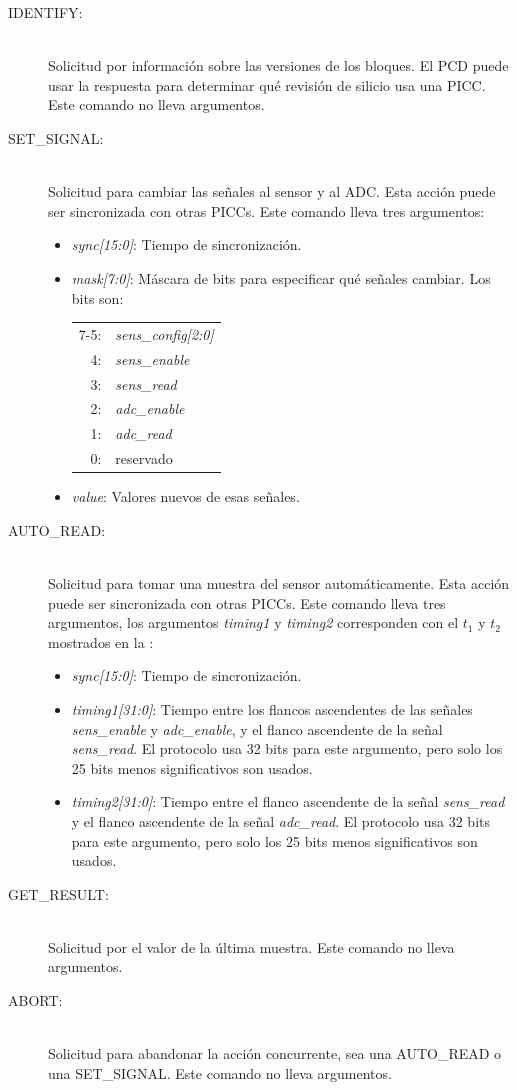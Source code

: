 \documentclass[a4paper, twoside, 11pt]{report}
\begin{document}
\begin{description}
  \item[IDENTIFY:] \hfill \\ Solicitud por información sobre las versiones de los bloques. El PCD puede usar la respuesta para determinar qué revisión de silicio usa una PICC. Este comando no lleva argumentos.
  \item[SET\_SIGNAL:] \hfill \\ Solicitud para cambiar las señales al sensor y al ADC. Esta acción puede ser sincronizada con otras PICCs. Este comando lleva tres argumentos:
  \begin{itemize}
    \item \textit{sync[15:0]}: Tiempo de sincronización.
    \item \textit{mask[7:0]}: Máscara de bits para especificar qué señales cambiar. Los bits son:
    
    \begin{tabular}{r l}
      7-5: & \textit{sens\_config[2:0]} \\
      4: & \textit{sens\_enable} \\
      3: & \textit{sens\_read} \\
      2: & \textit{adc\_enable} \\
      1: & \textit{adc\_read} \\
      0: & reservado \\
    \end{tabular}
    \item \textit{value}: Valores nuevos de esas señales.
  \end{itemize}
  \item[AUTO\_READ:] \hfill \\ Solicitud para tomar una muestra del sensor automáticamente. Esta acción puede ser sincronizada con otras PICCs. Este comando lleva tres argumentos, los argumentos \textit{timing1} y \textit{timing2} corresponden con el $t_1$ y $t_2$ mostrados en la :
  \begin{itemize}
    \item \textit{sync[15:0]}: Tiempo de sincronización.
    \item \textit{timing1[31:0]}: Tiempo entre los flancos ascendentes de las señales \textit{sens\_enable} y \textit{adc\_enable}, y el flanco ascendente de la señal \textit{sens\_read}. El protocolo usa 32 bits para este argumento, pero solo los 25 bits menos significativos son usados.
    \item \textit{timing2[31:0]}: Tiempo entre el flanco ascendente de la señal \textit{sens\_read} y el flanco ascendente de la señal \textit{adc\_read}. El protocolo usa 32 bits para este argumento, pero solo los 25 bits menos significativos son usados.
  \end{itemize}
  \item[GET\_RESULT:] \hfill \\ Solicitud por el valor de la última muestra. Este comando no lleva argumentos.
  \item[ABORT:] \hfill \\ Solicitud para abandonar la acción concurrente, sea una AUTO\_READ o una SET\_SIGNAL. Este comando no lleva argumentos.
\end{description}
\end{document}
